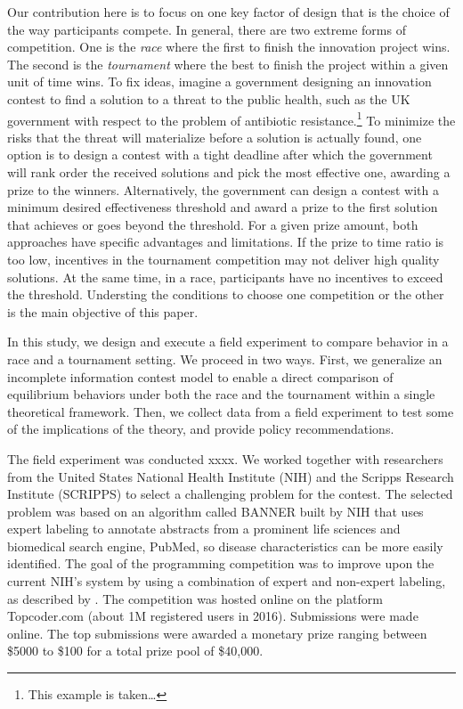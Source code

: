 \documentclass[12pt,]{article}
\begin{document}
Our contribution here is to focus on one key factor of design that is
the choice of the way participants compete. In general, there are two
extreme forms of competition. One is the \emph{race} where the first to
finish the innovation project wins. The second is the \emph{tournament}
where the best to finish the project within a given unit of time wins.
To fix ideas, imagine a government designing an innovation contest to
find a solution to a threat to the public health, such as the UK
government with respect to the problem of antibiotic
resistance.\footnote{This example is taken\ldots{}} To minimize the
risks that the threat will materialize before a solution is actually
found, one option is to design a contest with a tight deadline after
which the government will rank order the received solutions and pick the
most effective one, awarding a prize to the winners. Alternatively, the
government can design a contest with a minimum desired effectiveness
threshold and award a prize to the first solution that achieves or goes
beyond the threshold. For a given prize amount, both approaches have
specific advantages and limitations. If the prize to time ratio is too
low, incentives in the tournament competition may not deliver high
quality solutions. At the same time, in a race, participants have no
incentives to exceed the threshold. Understing the conditions to choose
one competition or the other is the main objective of this paper.

In this study, we design and execute a field experiment to compare
behavior in a race and a tournament setting. We proceed in two ways.
First, we generalize an incomplete information contest model
\citep{moldovanu2001optimal} to enable a direct comparison of
equilibrium behaviors under both the race and the tournament within a
single theoretical framework. Then, we collect data from a field
experiment to test some of the implications of the theory, and provide
policy recommendations.

The field experiment was conducted xxxx. We worked together with
researchers from the United States National Health Institute (NIH) and
the Scripps Research Institute (SCRIPPS) to select a challenging problem
for the contest. The selected problem was based on an algorithm called
BANNER built by NIH \citep{leaman2008banner} that uses expert labeling
to annotate abstracts from a prominent life sciences and biomedical
search engine, PubMed, so disease characteristics can be more easily
identified. The goal of the programming competition was to improve upon
the current NIH's system by using a combination of expert and non-expert
labeling, as described by \citet{good2014microtask}. The competition was
hosted online on the platform Topcoder.com (about 1M registered users in
2016). Submissions were made online. The top submissions were awarded a
monetary prize ranging between \$5000 to \$100 for a total prize pool of
\$40,000.
\end{document}
